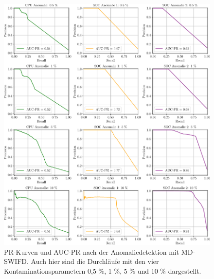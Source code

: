 \begin{figure}[t!]
    \centering
        \includegraphics[width=1\linewidth]{ch5_anomalieerkennung/abbildungen/MDSWIFD_PR_AUC_PR.pdf}
    \caption{\centering PR-Kurven und AUC-PR nach der Anomaliedetektion mit MD-SWIFD. Auch hier sind die Durchläufe mit den vier
    Kontaminationsparametern 0,5 \%, 1 \%, 5 \% und 10 \% dargestellt.}
    \label{fig:MDSWIFD_AUC_PR}
\end{figure}


